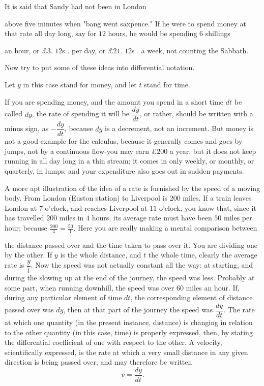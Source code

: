 \documentclass{ximera}
\begin{document}
It is said that Sandy had not been in London

above five minutes when "bang went saxpence." If
he were to spend money at that rate all day long,
say for $12$ hours, he would be spending $6$ shillings

an hour, or $\pounds$$3$. $12$s . per day, or $\pounds$$21$. $12$s . a week,
not counting the Sabbath.

Now try to put some of these ideas into differential
notation.

Let $y$ in this case stand for money, and let $t$ stand
for time.

If you are spending money, and the amount you
spend in a short time $dt$ be called $dy$, the rate of
spending it will be $\dfrac{dy}{dt}$, or rather, should be written
with a minus sign, as $-\dfrac{dy}{dt}$, because $dy$ is a decrement,
not an increment. But money is not a good example
for the calculus, because it generally comes and goes
by jumps, not by a continuous flow-you may earn
$\pounds$$200$ a year, but it does not keep running in all
day long in a thin stream; it comes in only weekly,
or monthly, or quarterly, in lumps: and your expenditure
also goes out in sudden payments.

A more apt illustration of the idea of a rate is
furnished by the speed of a moving body. From
London (Euston station) to Liverpool is $200$ miles.
If a train leaves London at $7$ o'clock, and reaches
Liverpool at $11$ o'clock, you know that, since it has
travelled $200$ miles in $4$ hours, its average rate must
have been $50$ miles per hour; because $\frac{200}{4} = \frac{50}{1}$. Here
you are really making a mental comparison between

the distance passed over and the time taken to pass
over it. You are dividing one by the other. If $y$ is
the whole distance, and $t$ the whole time, clearly the
average rate is $\dfrac{y}{t}$. Now the speed was not actually
constant all the way: at starting, and during the
slowing up at the end of the journey, the speed was
less. Probably at some part, when running downhill,
the speed was over $60$ miles an hour. If, during
any particular element of time $dt$, the corresponding
element of distance passed over was $dy$, then at that
part of the journey the speed was $\dfrac{dy}{dt}$. The rate at
which one quantity (in the present instance, distance)
is changing in relation to the other quantity (in this
case, time) is properly expressed, then, by stating the
differential coefficient of one with respect to the other.
A velocity, scientifically expressed, is the rate at which
a very small distance in any given direction is being
passed over; and may therefore be written
\[
v = \dfrac{dy}{dt}.
\]
\end{document}
